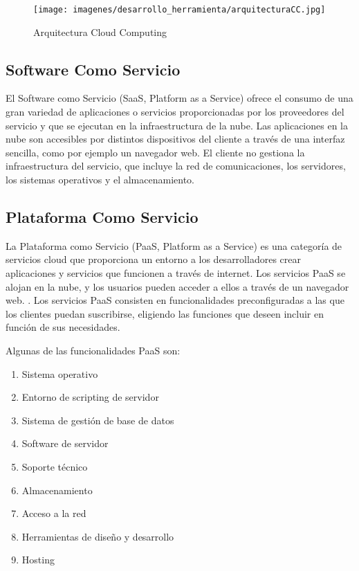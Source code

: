 \documentclass[a4paper,11pt]{book}
\begin{document}
 
\begin{figure}[H] 
\centering 
\texttt{[image: imagenes/desarrollo\_herramienta/arquitecturaCC.jpg]}
\caption{ Arquitectura Cloud Computing\cite{arquitecturaCC} }
\end{figure}

\subsection{Software Como Servicio}

El Software como Servicio\cite{saas} (SaaS, Platform as a Service) ofrece el consumo de una gran variedad de aplicaciones o servicios proporcionadas por los proveedores del servicio y que se ejecutan en la infraestructura de la nube. Las aplicaciones en la nube son accesibles por distintos dispositivos del cliente a través de una interfaz sencilla, como por ejemplo un navegador web. El cliente no gestiona la infraestructura del servicio, que incluye la red de comunicaciones, los servidores, los sistemas operativos y el almacenamiento.

\subsection{Plataforma Como Servicio}

La Plataforma como Servicio\cite{paas} (PaaS, Platform as a Service) es una categoría de servicios cloud que proporciona un entorno a los desarrolladores crear aplicaciones y servicios que funcionen a través de internet. Los servicios PaaS se alojan en la nube, y los usuarios pueden acceder a ellos a través de un navegador web. . Los servicios PaaS consisten en funcionalidades preconfiguradas a las que los clientes puedan suscribirse, eligiendo las funciones que deseen incluir en función de sus necesidades.

Algunas de las funcionalidades PaaS son:

\begin{enumerate}
\item Sistema operativo 
\item Entorno de scripting de servidor 
\item Sistema de gestión de base de datos 
\item Software de servidor 
\item Soporte técnico 
\item Almacenamiento 
\item Acceso a la red 
\item Herramientas de diseño y desarrollo 
\item Hosting 
\end{enumerate}
\end{document}
